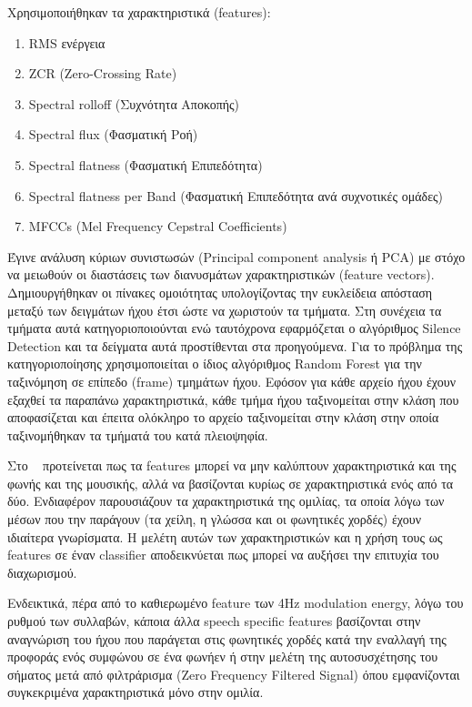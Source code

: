 Χρησιμοποιήθηκαν τα χαρακτηριστικά (features):
\begin{enumerate}[noitemsep]
\item RMS ενέργεια
\item ZCR (Zero-Crossing Rate)
\item Spectral rolloff (Συχνότητα Αποκοπής)
\item Spectral flux (Φασματική Ροή)
\item Spectral flatness (Φασματική Επιπεδότητα)
\item Spectral flatness per Band (Φασματική Επιπεδότητα ανά συχνοτικές ομάδες)
\item MFCCs (Mel Frequency Cepstral Coefficients)
\end{enumerate}

Έγινε ανάλυση κύριων συνιστωσών (Principal component analysis ή PCA) με στόχο να
μειωθούν οι διαστάσεις των διανυσμάτων χαρακτηριστικών (feature vectors).
Δημιουργήθηκαν οι πίνακες ομοιότητας υπολογίζοντας την ευκλείδεια απόσταση
μεταξύ των δειγμάτων ήχου έτσι ώστε να χωριστούν τα τμήματα. Στη συνέχεια τα
τμήματα αυτά κατηγοριοποιούνται ενώ ταυτόχρονα εφαρμόζεται ο αλγόριθμος Silence
Detection και τα δείγματα αυτά προστίθενται στα προηγούμενα. Για το πρόβλημα της
κατηγοριοποίησης χρησιμοποιείται ο ίδιος αλγόριθμος Random Forest για την
ταξινόμηση σε επίπεδο (frame) τμημάτων ήχου. Εφόσον για κάθε αρχείο ήχου έχουν
εξαχθεί τα παραπάνω χαρακτηριστικά, κάθε τμήμα ήχου ταξινομείται στην κλάση που
αποφασίζεται και έπειτα ολόκληρο το αρχείο ταξινομείται στην κλάση στην οποία
ταξινομήθηκαν τα τμήματά του κατά πλειοψηφία.

\vspace{1em}
Στο ~\cite{speech} προτείνεται πως τα features μπορεί να μην καλύπτουν
χαρακτηριστικά και της φωνής και της μουσικής, αλλά να βασίζονται κυρίως σε
χαρακτηριστικά ενός από τα δύο. Ενδιαφέρον παρουσιάζουν τα χαρακτηριστικά της
ομιλίας, τα οποία λόγω των μέσων που την παράγουν (τα χείλη, η γλώσσα και οι
φωνητικές χορδές) έχουν ιδιαίτερα γνωρίσματα. Η μελέτη αυτών των χαρακτηριστικών
και η χρήση τους ως features σε έναν classifier αποδεικνύεται πως μπορεί να
αυξήσει την επιτυχία του διαχωρισμού.

Ενδεικτικά, πέρα από το καθιερωμένο feature των 4Hz modulation energy, λόγω του
ρυθμού των συλλαβών, κάποια άλλα speech specific features βασίζονται στην
αναγνώριση του ήχου που παράγεται στις φωνητικές χορδές κατά την εναλλαγή της
προφοράς ενός συμφώνου σε ένα φωνήεν ή στην μελέτη της αυτοσυσχέτησης του
σήματος μετά από φιλτράρισμα (Zero Frequency Filtered Signal) όπου εμφανίζονται
συγκεκριμένα χαρακτηριστικά μόνο στην ομιλία.

